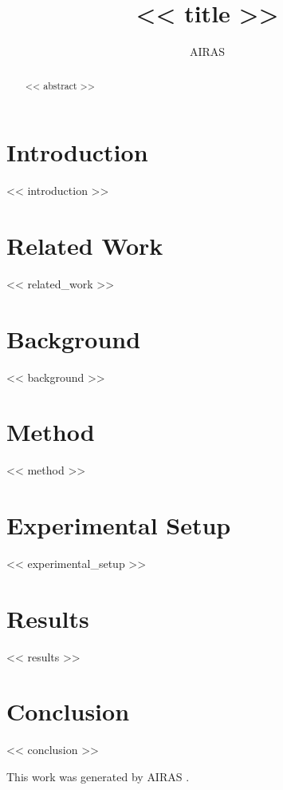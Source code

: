 \documentclass{article} %
\title{<< title >>}
\author{AIRAS}
\begin{document}
\maketitle

\begin{abstract}
<< abstract >>
\end{abstract}

\section{Introduction}
\label{sec:intro}
<< introduction >>

\section{Related Work}
\label{sec:related}
<< related_work >>

\section{Background}
\label{sec:background}
<< background >>

\section{Method}
\label{sec:method}
<< method >>

\section{Experimental Setup}
\label{sec:experimental}
<< experimental_setup >>

\section{Results}
\label{sec:results}
<< results >>

\section{Conclusion}
\label{sec:conclusion}
<< conclusion >>

This work was generated by \textsc{AIRAS} \citep{airas2025}.



\end{document}
